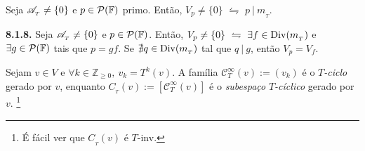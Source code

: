 \begin{proposition}
    \label{prop:8.1.7}
    Seja \(\mathscr{A}_{_T} \neq \{0\}\) e \(p \in \mathcal{P}(\mathbb{F})\) primo. Então, \(V_p \neq \{0\}\) \(\leftrightharpoons\) \(p\ | \ m_{_T}\). 
\end{proposition}


\begin{corollary}
    \label{coro:8.1.8}
    \textbf{8.1.8.} Seja \(\mathscr{A}_{_T} \neq \{0\}\) e \(p \in \mathcal{P}(\mathbb{F})\). Então, \(V_p\neq \{0\}\ \leftrightharpoons\ \exists f \in \operatorname{Div}(m_{_T})\) e \(\exists g \in \mathcal{P}(\mathbb{F})\) tais que \(p = gf\). Se \(\nexists q \in \operatorname{Div}(m_{_T})\) tal que \(q \ | \ g\), então \(V_p = V_f\). 
\end{corollary}


\begin{definition}
    Sejam \(v\in V\) e \(\forall k \in \mathbb{Z}_{\geq 0}, \ v_k = T^k(v)\). A família \(\mathscr{C}^\infty_{T}(v):= (v_k)\)  é o \(T\)\emph{-ciclo} gerado por \(v\), enquanto \(C_{_T}(v) := [\mathscr{C}^\infty_T(v)]\) é o \emph{subespaço} \(T\)\emph{-cíclico} gerado por \(v\). \footnote{É fácil ver que \(C_{_T}(v)\) é \(T\)-inv.}
\end{definition}




